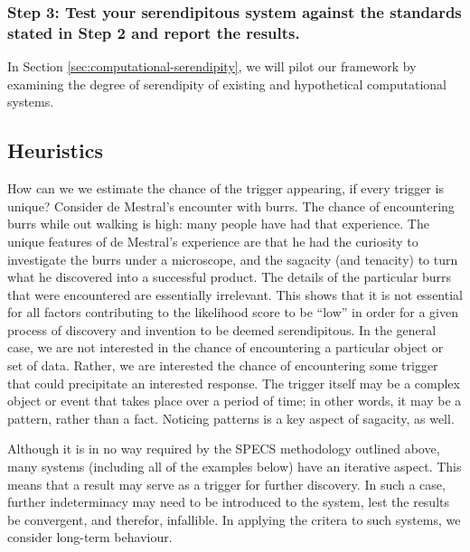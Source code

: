 \subsubsection*{Step 3: Test your serendipitous system against the standards stated in Step 2 and report the results.}

\noindent In Section \ref{sec:computational-serendipity}, we will pilot our framework by examining the degree of serendipity of existing and hypothetical computational systems. 

\subsection{Heuristics}\label{specs-heuristics}

How can we we estimate the chance of the trigger appearing, if every
trigger is unique?  Consider de Mestral's encounter with burrs.
The chance of encountering burrs while out walking is high: many
people have had that experience.  The unique features of de Mestral's
experience are that he had the curiosity to investigate the burrs
under a microscope, and the sagacity (and tenacity) to turn what he
discovered into a successful product.  The details of the particular
burrs that were encountered are essentially irrelevant.  This shows that it is not essential for all factors contributing to the likelihood score to be ``low'' in order for a given process of discovery and invention to be deemed serendipitous. In the general case, we are not interested in the chance of encountering a particular object or set of data.  Rather, we are interested the chance of encountering some trigger that could precipitate an interested response.  The trigger itself may be a complex object or event that takes place over a period of time; in other words, it may be a pattern, rather than a fact.  Noticing patterns is a key aspect of sagacity, as well.

Although it is in no way required by the SPECS methodology outlined
above, many systems (including all of the examples below) have an
iterative aspect.  This means that a result may serve as a trigger for
further discovery.  In such a case, further
indeterminacy may need to be introduced to the system, lest the results be
convergent, and therefor, infallible.  In applying the critera to
such systems, we consider long-term behaviour.


